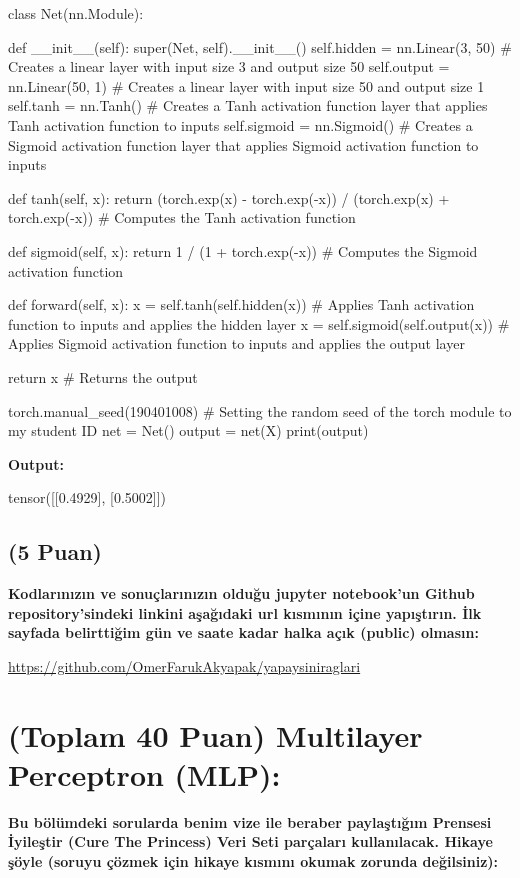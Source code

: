 \documentclass[11pt]{article}
\begin{document}
\begin{python}
class Net(nn.Module):

    def __init__(self):
        super(Net, self).__init__()
        self.hidden = nn.Linear(3, 50)  # Creates a linear layer with input size 3 and output size 50
        self.output = nn.Linear(50, 1)  # Creates a linear layer with input size 50 and output size 1
        self.tanh = nn.Tanh()  # Creates a Tanh activation function layer that applies Tanh activation function to inputs
        self.sigmoid = nn.Sigmoid()  # Creates a Sigmoid activation function layer that applies Sigmoid activation function to inputs

    def tanh(self, x):
        return (torch.exp(x) - torch.exp(-x)) / (torch.exp(x) + torch.exp(-x))  # Computes the Tanh activation function

    def sigmoid(self, x):
        return 1 / (1 + torch.exp(-x))  # Computes the Sigmoid activation function

    def forward(self, x):
        x = self.tanh(self.hidden(x))  # Applies Tanh activation function to inputs and applies the hidden layer
        x = self.sigmoid(self.output(x))  # Applies Sigmoid activation function to inputs and applies the output layer

        return x  # Returns the output

torch.manual_seed(190401008)  # Setting the random seed of the torch module to my student ID
net = Net()
output = net(X)
print(output)
\end{python}

\textbf{Output:} 

tensor([[0.4929],
        [0.5002]])

\subsection{(5 Puan)} \textbf{Kodlarınızın ve sonuçlarınızın olduğu jupyter notebook'un Github repository'sindeki linkini aşağıdaki url kısmının içine yapıştırın. İlk sayfada belirttiğim gün ve saate kadar halka açık (public) olmasın:}

\url{https://github.com/OmerFarukAkyapak/yapaysiniraglari}

\section{(Toplam 40 Puan) Multilayer Perceptron (MLP):} 
\textbf{Bu bölümdeki sorularda benim vize ile beraber paylaştığım Prensesi İyileştir (Cure The Princess) Veri Seti parçaları kullanılacak. Hikaye şöyle (soruyu çözmek için hikaye kısmını okumak zorunda değilsiniz):} 
\end{document}
